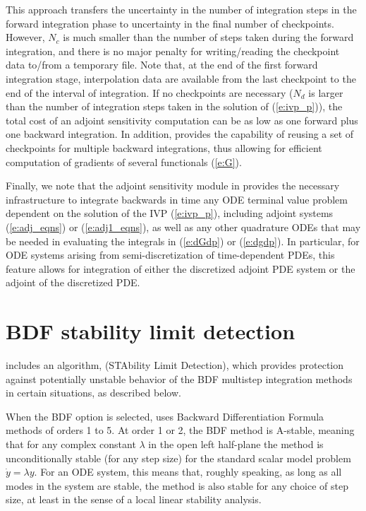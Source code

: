 This approach transfers the uncertainty in the number of integration
steps in the forward integration phase to uncertainty in the final
number of checkpoints.  However, $N_c$ is much smaller than the number
of steps taken during the forward integration, and there is no major
penalty for writing/reading the checkpoint data to/from a temporary
file.
%
Note that, at the end of the first forward integration stage, interpolation
data are available from the last checkpoint to the end of the interval
of integration.  If no checkpoints are necessary ($N_d$ is larger than the 
number of integration steps taken in the solution of (\ref{e:ivp_p})),
the total cost of an adjoint sensitivity computation can be as low as one forward
plus one backward integration.
%
In addition, {\cvodes} provides the capability of reusing a set of checkpoints
for multiple backward integrations, thus allowing for efficient computation of
gradients of several functionals (\ref{e:G}).

\bigskip

Finally, we note that the adjoint sensitivity module in {\cvodes} provides the
necessary infrastructure to integrate backwards in time any ODE terminal value
problem dependent on the solution of the IVP (\ref{e:ivp_p}), including
adjoint systems (\ref{e:adj_eqns}) or (\ref{e:adj1_eqns}), as well as any other
quadrature ODEs that may be needed in evaluating the integrals in (\ref{e:dGdp}) 
or (\ref{e:dgdp}). In particular, for ODE systems arising from semi-discretization
of time-dependent PDEs, this feature allows for integration of either the 
discretized adjoint PDE system or the adjoint of the discretized PDE.


\section{BDF stability limit detection}\label{s:bdf_stab}

{\cvodes} includes an algorithm, {\stald} (STAbility Limit Detection),
which provides protection against potentially unstable behavior of the 
BDF multistep integration methods in certain situations, as described below.

When the BDF option is selected, {\cvodes} uses Backward Differentiation 
Formula methods of orders 1 to 5.  At order 1 or 2, the BDF
method is A-stable, meaning that for any complex constant $\lambda$ in
the open left half-plane the method is unconditionally stable (for
any step size) for the standard scalar model problem ${\dot y} = \lambda y$.
For an ODE system, this means that, roughly speaking, as long as all
modes in the system are stable, the method is also stable for any
choice of step size, at least in the sense of a local linear stability
analysis.

